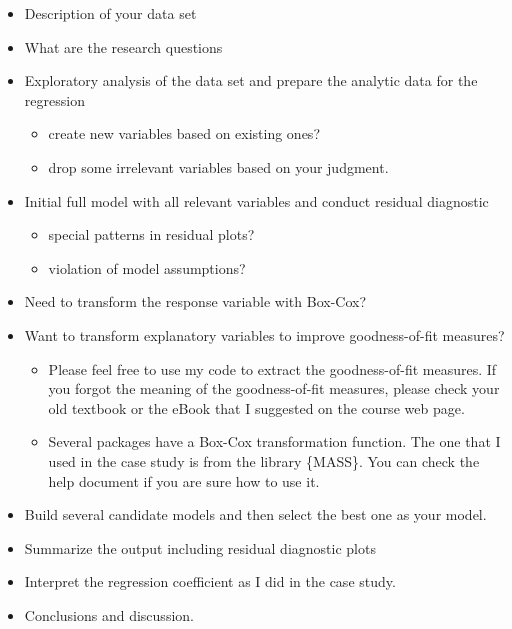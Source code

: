\documentclass[
]{book}
\providecommand{\tightlist}{%
  \setlength{\itemsep}{0pt}\setlength{\parskip}{0pt}}
\begin{document}
\begin{itemize}
\tightlist
\item
  Description of your data set
\item
  What are the research questions
\item
  Exploratory analysis of the data set and prepare the analytic data for the regression

  \begin{itemize}
  \tightlist
  \item
    create new variables based on existing ones?
  \item
    drop some irrelevant variables based on your judgment.
  \end{itemize}
\item
  Initial full model with all relevant variables and conduct residual diagnostic

  \begin{itemize}
  \tightlist
  \item
    special patterns in residual plots?
  \item
    violation of model assumptions?
  \end{itemize}
\item
  Need to transform the response variable with Box-Cox?
\item
  Want to transform explanatory variables to improve goodness-of-fit measures?

  \begin{itemize}
  \tightlist
  \item
    Please feel free to use my code to extract the goodness-of-fit measures. If you forgot the meaning of the goodness-of-fit measures, please check your old textbook or the eBook that I suggested on the course web page.
  \item
    Several packages have a Box-Cox transformation function. The one that I used in the case study is from the library \{MASS\}. You can check the help document if you are sure how to use it.
  \end{itemize}
\item
  Build several candidate models and then select the best one as your model.
\item
  Summarize the output including residual diagnostic plots
\item
  Interpret the regression coefficient as I did in the case study.
\item
  Conclusions and discussion.
\end{itemize}
\end{document}
